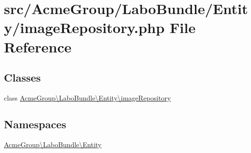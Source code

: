 \hypertarget{image_repository_8php}{\section{src/\+Acme\+Group/\+Labo\+Bundle/\+Entity/image\+Repository.php File Reference}
\label{image_repository_8php}
}
\subsection*{Classes}
\begin{DoxyCompactItemize}
\item 
class \hyperlink{class_acme_group_1_1_labo_bundle_1_1_entity_1_1image_repository}{Acme\+Group\textbackslash{}\+Labo\+Bundle\textbackslash{}\+Entity\textbackslash{}image\+Repository}
\end{DoxyCompactItemize}
\subsection*{Namespaces}
\begin{DoxyCompactItemize}
\item 
 \hyperlink{namespace_acme_group_1_1_labo_bundle_1_1_entity}{Acme\+Group\textbackslash{}\+Labo\+Bundle\textbackslash{}\+Entity}
\end{DoxyCompactItemize}
